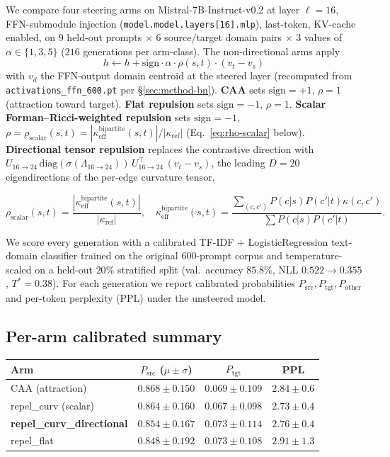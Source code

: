 \documentclass[10pt,twocolumn]{article}
\begin{document}
We compare four steering arms on Mistral-7B-Instruct-v0.2 at layer $\ell{=}16$, FFN-submodule injection (\texttt{model.model.layers[16].mlp}), last-token, KV-cache enabled, on $9$ held-out prompts $\times$ $6$ source/target domain pairs $\times$ $3$ values of $\alpha\in\{1,3,5\}$ ($216$ generations per arm-class). The non-directional arms apply
\begin{equation}
h\leftarrow h + \mathrm{sign}\cdot\alpha\cdot\rho(s,t)\cdot(v_t - v_s)
\end{equation}
with $v_d$ the FFN-output domain centroid at the steered layer (recomputed from \texttt{activations\_ffn\_600.pt} per \S\ref{sec:method-bn}). \textbf{CAA} sets $\mathrm{sign}{=}{+}1$, $\rho{=}1$ (attraction toward target). \textbf{Flat repulsion} sets $\mathrm{sign}{=}{-}1$, $\rho{=}1$. \textbf{Scalar Forman--Ricci-weighted repulsion} sets $\mathrm{sign}{=}{-}1$, $\rho{=}\rho_{\text{scalar}}(s,t){=}|\kappa_{\text{eff}}^{\text{bipartite}}(s,t)|/|\kappa_{\text{ref}}|$ (Eq.~\ref{eq:rho-scalar} below). \textbf{Directional tensor repulsion} replaces the contrastive direction with $U_{16\to 24}\,\mathrm{diag}(\sigma(\Lambda_{16\to 24}))\,U_{16\to 24}^{\!\top}\,(v_t-v_s)$, the leading $D{=}20$ eigendirections of the per-edge curvature tensor.

\begin{equation}
\rho_{\text{scalar}}(s,t){=}\frac{|\kappa_{\text{eff}}^{\text{bipartite}}(s,t)|}{|\kappa_{\text{ref}}|},\quad \kappa_{\text{eff}}^{\text{bipartite}}(s,t){=}\frac{\sum_{(c,c')}P(c|s)P(c'|t)\kappa(c,c')}{\sum P(c|s)P(c'|t)}.
\label{eq:rho-scalar}
\end{equation}

We score every generation with a calibrated TF-IDF + LogisticRegression text-domain classifier trained on the original $600$-prompt corpus and temperature-scaled on a held-out $20\%$ stratified split (val.\ accuracy $85.8\%$, NLL $0.522\to 0.355$, $T^*{=}0.38$). For each generation we report calibrated probabilities $P_{\text{src}}, P_{\text{tgt}}, P_{\text{other}}$ and per-token perplexity (PPL) under the unsteered model.

\subsection{Per-arm calibrated summary}
\label{sec:steering-results}

\begin{center}\small
\begin{tabular}{lccc}
\toprule
Arm & $P_{\text{src}}$ ($\mu\pm\sigma$) & $P_{\text{tgt}}$ & PPL \\
\midrule
CAA (attraction)              & $0.868\pm 0.150$ & $0.069\pm 0.109$ & $2.84\pm 0.6$ \\
repel\_curv (scalar)          & $0.864\pm 0.160$ & $0.067\pm 0.098$ & $2.73\pm 0.4$ \\
\textbf{repel\_curv\_directional} & $0.854\pm 0.167$ & $0.073\pm 0.114$ & $2.76\pm 0.4$ \\
repel\_flat                   & $0.848\pm 0.192$ & $0.073\pm 0.108$ & $2.91\pm 1.3$ \\
\bottomrule
\end{tabular}
\end{center}
\end{document}
